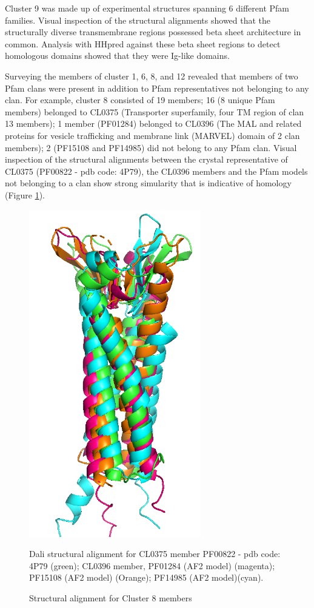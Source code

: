 Cluster 9 was made up of experimental structures spanning 6 different Pfam families.  Visual inspection of the structural alignments showed that the structurally diverse transmembrane regions possessed beta sheet architecture in common.  Analysis with HHpred against these beta sheet regions  to detect homologous domains showed that they were Ig-like domains.

Surveying the members of cluster 1, 6, 8, and 12 revealed that members of two Pfam clans were present in addition to Pfam representatives not belonging to any clan.  For example, cluster 8 consisted of 19 members; 16 (8 unique Pfam members) belonged to CL0375 (Transporter superfamily, four TM region of clan 13 members); 1 member (PF01284) belonged to CL0396 (The MAL and related proteins for vesicle trafficking and membrane link (MARVEL) domain of 2 clan members); 2 (PF15108 and PF14985) did not belong to any Pfam clan.  Visual inspection of the structural alignments between the crystal representative of CL0375 (PF00822 - pdb code: 4P79), the CL0396 members and the Pfam models not belonging to a clan  show strong simularity that is indicative of homology (Figure \ref{fig:cluster_8}).

\begin{figure}[th!]
    \centering
    \includegraphics[width=75mm, scale=0.75]{Pfam/cluster_8.png}
    \caption{Structural alignment for Cluster 8 members}
    \label{fig:cluster_8}
    \small
    \begin{flushleft}Dali structural alignment for CL0375 member PF00822 - pdb code: 4P79 (green); CL0396 member, PF01284 (AF2 model) (magenta); PF15108 (AF2 model) (Orange); PF14985 (AF2 model)(cyan). \end{flushleft}
\end{figure}

